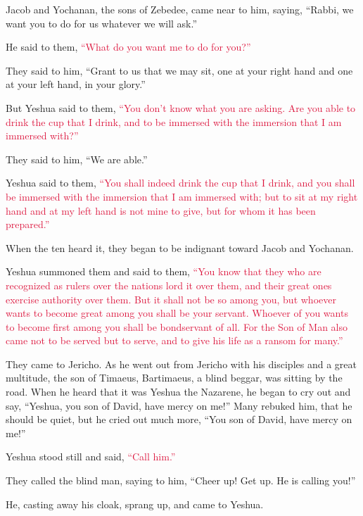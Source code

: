 \myverse{}Jacob and Yochanan, the sons of Zebedee, came near to him, saying,
“Rabbi, we want you to do for us whatever we will ask.”

\myverse{}He said to them,
\textcolor{crimson}{“What do you want me to do for you?”}

\myverse{}They said to him, “Grant to us that we may sit, one at your
right hand and one at your left hand, in your glory.”

\myverse{}But Yeshua said to them,
\textcolor{crimson}{“You don’t know what you are asking. Are you able to drink the cup that I drink, and to be immersed
	with the immersion that I am immersed with?”}

\myverse{}They said to him, “We are able.”

Yeshua said to them,
\textcolor{crimson}{“You shall indeed drink the cup that I drink, and you shall be immersed with the immersion that I
	am immersed with;
}
\myverse{}\textcolor{crimson}{but to sit at my right hand and at my left hand is not mine to give,
	but for whom it has been prepared.”}

\myverse{}When the ten heard it, they began to be indignant toward Jacob
and Yochanan.

\myverse{}Yeshua summoned them and said to them,
\textcolor{crimson}{“You know that they who are recognized as rulers over the nations lord it over them, and their great
	ones exercise authority over them.
}
\myverse{}\textcolor{crimson}{But it shall not be so among you, but whoever wants to become great among
	you shall be your servant.
}
\myverse{}\textcolor{crimson}{Whoever of you wants to become first among you shall be bondservant of
	all.
}
\myverse{}\textcolor{crimson}{For the Son of Man also came not to be served but to serve, and to give
	his life as a ransom for many.”}

\myverse{}They came to Jericho. As he went out from Jericho with his disciples
and a great multitude, the son of Timaeus, Bartimaeus, a blind beggar, was sitting by the road.
\myverse{}When he heard that it was Yeshua the Nazarene, he began to cry out and say,
“Yeshua, you son of David, have mercy on me!”
\myverse{}Many rebuked him, that he should be quiet, but he cried out much more, “You
son of David, have mercy on me!”

\myverse{}Yeshua stood still and said,
\textcolor{crimson}{“Call him.”}

They called the blind man, saying to him, “Cheer up! Get up. He is calling you!”

\myverse{}He, casting away his cloak, sprang up, and came to Yeshua.

